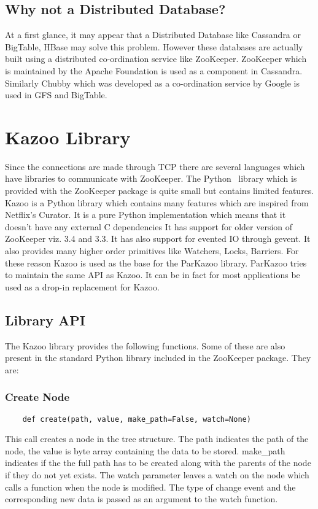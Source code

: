\subsection{Why not a Distributed Database?}
At a first glance, it may appear that a Distributed Database like Cassandra or BigTable, HBase may solve this problem. However these databases are actually built using a distributed co-ordination service like ZooKeeper. ZooKeeper which is maintained by the Apache Foundation is used as a component in Cassandra. Similarly Chubby which was developed as a co-ordination service by Google is used in GFS and BigTable.

\section{Kazoo Library}
Since the connections are made through TCP there are several languages which have libraries to communicate with ZooKeeper. The Python~\cite{van2002python} library which is provided with the ZooKeeper package is quite small but contains limited features. Kazoo is a Python library which contains many features which are inspired from Netflix's Curator. It is a pure Python implementation which means that it doesn't have any external C dependencies It has support for older version of ZooKeeper viz. 3.4 and 3.3. It has also support for evented IO through gevent. It also provides many higher order primitives like Watchers, Locks, Barriers. For these reason Kazoo is used as the base for the ParKazoo library. ParKazoo tries to maintain the same API as Kazoo. It can be in fact for most applications be used as a drop-in replacement for Kazoo.

\subsection{Library API}
The Kazoo library provides the following functions. Some of these are also present in the standard Python library included in the ZooKeeper package. They are:
  \subsubsection{Create Node}
  \begin{lstlisting}
    def create(path, value, make_path=False, watch=None)
  \end{lstlisting}
  This call creates a node in the tree structure. The path indicates the path of the node, the value is byte array containing the data to be stored. make\_path indicates if the the full path has to be created along with the parents of the node if they do not yet exists. The watch parameter leaves a watch on the node which calls a function when the node is modified. The type of change event and the corresponding new data is passed as an argument to the watch function.

